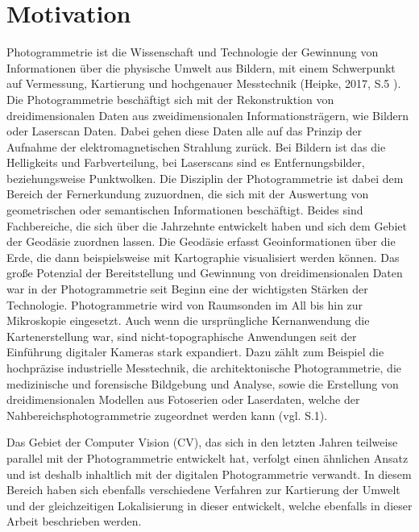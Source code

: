 \chapter{Motivation}

Photogrammetrie ist \glqq die Wissenschaft und Technologie der Gewinnung von Informationen
über die physische Umwelt aus Bildern, mit einem Schwerpunkt auf Vermessung,
Kartierung und hochgenauer Messtechnik\grqq{} (Heipke, 2017, S.5 \cite{photo}).  Die Photogrammetrie beschäftigt sich  mit der Rekonstruktion von dreidimensionalen Daten aus zweidimensionalen Informationsträgern, wie Bildern oder Laserscan Daten. Dabei gehen diese Daten alle auf das Prinzip der Aufnahme der elektromagnetischen Strahlung zurück. Bei Bildern ist das die Helligkeits und Farbverteilung, bei Laserscans sind es Entfernungsbilder, beziehungsweise Punktwolken. Die Disziplin der Photogrammetrie ist dabei dem Bereich der Fernerkundung zuzuordnen, die sich mit der Auswertung von geometrischen oder semantischen Informationen beschäftigt. Beides sind Fachbereiche, die sich über die Jahrzehnte entwickelt haben und sich dem Gebiet der Geodäsie zuordnen lassen. Die Geodäsie erfasst Geoinformationen über die Erde, die dann beispielsweise mit Kartographie visualisiert werden können. Das große Potenzial der Bereitstellung und Gewinnung von dreidimensionalen Daten war in der Photogrammetrie seit Beginn eine der wichtigsten Stärken der Technologie. Photogrammetrie wird von Raumsonden im All bis hin zur Mikroskopie eingesetzt. Auch wenn die ursprüngliche Kernanwendung die Kartenerstellung war, sind nicht-topographische Anwendungen seit der Einführung digitaler Kameras stark expandiert. Dazu zählt zum Beispiel die hochpräzise industrielle Messtechnik, die architektonische Photogrammetrie, die medizinische und forensische Bildgebung und Analyse, sowie die Erstellung von dreidimensionalen Modellen aus Fotoserien oder Laserdaten, welche der Nahbereichsphotogrammetrie zugeordnet werden kann (vgl. \cite{state_of_art} S.1).


Das Gebiet der Computer Vision (CV), das sich in den letzten Jahren teilweise parallel mit der Photogrammetrie entwickelt hat, verfolgt einen ähnlichen Ansatz und ist deshalb inhaltlich mit der digitalen Photogrammetrie verwandt. In diesem Bereich haben sich ebenfalls verschiedene Verfahren zur Kartierung der Umwelt und der gleichzeitigen Lokalisierung in dieser entwickelt, welche ebenfalls in dieser Arbeit beschrieben werden.  \\ \\

